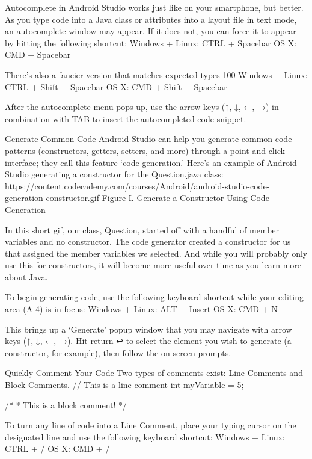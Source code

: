         Autocomplete in Android Studio works just like on your smartphone, but better. As you type code into a Java class or attributes into a layout file in text mode, an autocomplete window may appear. If it does not, you can force it to appear by hitting the following shortcut:
            Windows + Linux: CTRL + Spacebar
            OS X: CMD + Spacebar

        There’s also a fancier version that matches expected types 100%
            Windows + Linux: CTRL + Shift + Spacebar
            OS X: CMD + Shift + Spacebar

        After the autocomplete menu pops up, use the arrow keys (↑, ↓, ←, →) in combination with TAB to insert the autocompleted code snippet.
    
    Generate Common Code
        Android Studio can help you generate common code patterns (constructors, getters, setters, and more) through a point-and-click interface; they call this feature ‘code generation.’ Here’s an example of Android Studio generating a constructor for the Question.java class:
            🎨https://content.codecademy.com/courses/Android/android-studio-code-generation-constructor.gif  
                Figure I. Generate a Constructor Using Code Generation

        In this short gif, our class, Question, started off with a handful of member variables and no constructor. The code generator created a constructor for us that assigned the member variables we selected. And while you will probably only use this for constructors, it will become more useful over time as you learn more about Java.

        To begin generating code, use the following keyboard shortcut while your editing area (A-4) is in focus:
            Windows + Linux: ALT + Insert
            OS X: CMD + N

        This brings up a ‘Generate’ popup window that you may navigate with arrow keys (↑, ↓, ←, →). Hit return ↩ to select the element you wish to generate (a constructor, for example), then follow the on-screen prompts.

    Quickly Comment Your Code
        Two types of comments exist: Line Comments and Block Comments.
            // This is a line comment
            int myVariable = 5;
            
            /*
            * This is a block comment!
            */

        To turn any line of code into a Line Comment, place your typing cursor on the designated line and use the following keyboard shortcut:
            Windows + Linux: CTRL + /
            OS X: CMD + /


